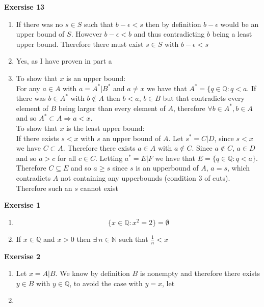 \documentclass[12pt]{article}
\newcounter{ques}[section]
\newenvironment{ques}[1]{\textbf{Exersise #1} \vspace{1mm}}{\medskip}
\theoremstyle{definition}
\begin{document}
\begin{ques}{13}
	\begin{enumerate}
		\item
			If there was no $s \in S$ such that $b - \epsilon < s$
			then by definition $b - \epsilon$ would be an upper
			bound of $S$. However $b - \epsilon < b$ and thus
			contradicting $b$ being a least upper bound. Therefore
			there must exist $s \in S$ with $b - \epsilon < s$
		\item
			Yes, as I have proven in part a
		\item
			To show that $x$ is an upper bound:\\
			For any $a \in A$ with $a = A^*|B^*$ and $a \neq x$ we
			have that $A^* = \{q \in \mathbb Q: q < a$. If there
			was $b \in A^*$ with $b \notin A$ then $b < a$, $b \in
			B$ but that contradicts every element of $B$ being
			larger than every element of $A$, therefore $\forall b
			\in A^*, b \in A$ and so $A^* \subset A \Rightarrow a
			<x$.\\
			To show that $x$ is the least upper bound:\\
			If there exists $s < x$ with $s$ an upper bound of $A$.
			Let $s^* = C|D$, since $s < x$ we have $C \subset A$.
			Therefore there exists $a \in A$ with $a \notin C$.
			Since $a \notin C$, $a \in D$ and so $a > c$ for all $c
			\in C$. Letting $a^* = E|F$ we have that $E = \{q \in
			\mathbb Q: q < a\}$. Therefore $C \subseteq E$ and so
			$a \geq s$ since $s$ is an upperbound of $A$, $a = s$,
			which contradicts $A$ not containing any upperbounds
			(condition 3 of cuts). Therefore such an $s$ cannot
			exist



	\end{enumerate}
\end{ques}

\begin{ques}{1}
	\begin{enumerate}
		\item
			$$\{x \in \mathbb Q: x^2 = 2\} = \emptyset$$
		\item
			If $x \in \mathbb Q$ and $x > 0$ then $\exists \ n \in
			\mathbb N$ such that $\frac 1 n < x$

	\end{enumerate}
\end{ques}

\begin{ques}{2}
\begin{enumerate}
		\item
			Let $x = A|B$. We know by definition $B$ is nonempty
			and therefore there exists $y \in B$ with $y \in
			\mathbb Q$, to avoid the case with $y = x$, let
		\item

	\end{enumerate}
\end{ques}
\end{document}
